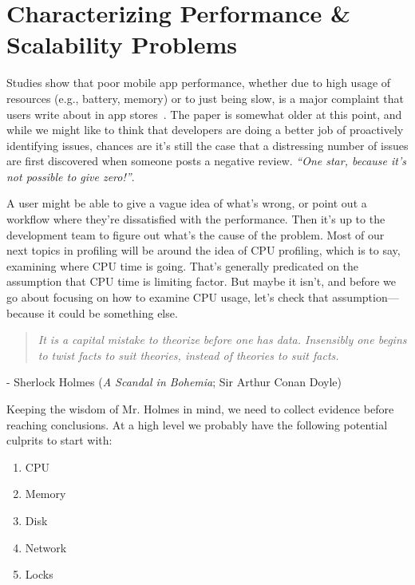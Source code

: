 




\section*{Characterizing Performance \& Scalability Problems}

Studies show that poor mobile app performance, whether due to high usage of resources (e.g., battery, memory) or to just being slow, is a major complaint that users write about in app stores~\cite{free-apps}. The paper is somewhat older at this point, and while we might like to think that developers are doing a better job of proactively identifying issues, chances are it's still the case that a distressing number of issues are first discovered when someone posts a negative review. \textit{``One star, because it's not possible to give zero!''}.

A user might be able to give a vague idea of what's wrong, or point out a workflow where they're dissatisfied with the performance. Then it's up to the development team to figure out what's the cause of the problem. Most of our next topics in profiling will be around the idea of CPU profiling, which is to say, examining where CPU time is going. That's generally predicated on the assumption that CPU time is limiting factor. But maybe it isn't, and before we go about focusing on how to examine CPU usage, let's check that assumption---because it could be something else.

\begin{quote}
\textit{It is a capital mistake to theorize before one has data. Insensibly one begins to twist facts to suit theories, instead of theories to suit facts.}
\end{quote}
\hfill - Sherlock Holmes (\textit{A Scandal in Bohemia}; Sir Arthur Conan Doyle)

Keeping the wisdom of Mr. Holmes in mind, we need to collect evidence before reaching conclusions. At a high level we probably have the following potential culprits to start with:
\begin{enumerate}[noitemsep]
	\item CPU
	\item Memory
	\item Disk
	\item Network
	\item Locks
\end{enumerate}


